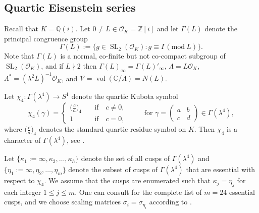 \documentclass[12pt,reqno]{amsart}
\numberwithin{equation}{section}
\renewcommand{\pmod}[1]{\, (\mathrm{mod}\ #1)}
\newcommand{\Z}{\mathbb{Z}}
\newcommand{\C}{\mathbb{C}}
\DeclareMathOperator{\vol}{vol}
\DeclareMathOperator{\SL}{SL}
\newcommand{\pMatrix}[4]{\left(\begin{matrix}#1 & #2 \\ #3 & #4\end{matrix}\right)}
\begin{document}
\subsection{Quartic Eisenstein series}

Recall that $K=\mathbb{Q}(i)$. Let $0 \neq L \in \mathcal{O}_K = \Z[i]$ and let $\Gamma(L)$ denote the principal congruence group 
\begin{equation*}
    \Gamma(L) := \big\{ g \in \SL_2(\mathcal{O}_K) : g \equiv I \pmod{L}\big\}.
\end{equation*}
Note that $\Gamma(L)$ is a normal, co-finite but not co-compact subgroup of $\SL_2(\mathcal{O}_K)$, and if $L \nmid 2$ then $\Gamma(L)_\infty = \Gamma(L)'_\infty$, $\Lambda = L \mathcal{O}_K$, $\Lambda^* = (\lambda^2 L )^{-1}\mathcal{O}_K$, and $\mathcal{V} = \vol(\C/\Lambda) =  N(L)$.

Let $\chi_4: \Gamma(\lambda^4) \to S^1$ denote the quartic Kubota \cite{Kub} symbol 
\begin{equation*}
    \chi_4(\gamma)=
    \begin{cases} 
        \big( \frac{c}{a} \big)_4 & \quad \text{if} \quad c \neq 0, \\ 1 & \quad \text{if} \quad c=0,
    \end{cases} 
    \qquad \text{ for }\gamma=\pMatrix {a} {b} {c} {d} \in \Gamma(\lambda^{4}),
\end{equation*}
where $\big(\frac{c}{a}\big)_4$ denotes the standard quartic residue symbol on $K$. Then $\chi_4$ is a character of $\Gamma(\lambda^4)$, see \cite[Lemma 1]{Suz1}.

Let $\{\kappa_1:=\infty, \kappa_2, \dots,\kappa_h\}$ denote the set of all cusps of $\Gamma(\lambda^4)$ and $\{\eta_1:=\infty, \eta_2, \dots, \eta_m \}$ denote the subset of cusps of $\Gamma(\lambda^4)$ that are essential with respect to $\chi_4$. 
 We assume that the cusps are enumerated such that $\kappa_j = \eta_j$ for each integer $1 \leq j \leq m$. One can consult \cite[Proposition 1]{Suz1} for the complete list of $m = 24$ essential cusps, and we choose scaling matrices $\sigma_i = \sigma_{\eta_i}$ according to \cite[Table 1]{Suz1}. 
\end{document}
